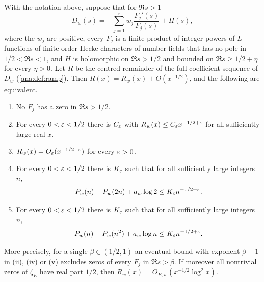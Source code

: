 \begin{theorem}\label{ana:thm:primeonly}
With the notation above, suppose that for $\Re s>1$
\[
 D_w(s)=-\sum_{j=1}^rw_j\frac{F_j'(s)}{F_j(s)}+H(s),
\]
where the $w_j$ are positive, every $F_j$ is a finite product of integer powers of
$L$-functions of finite-order Hecke characters of number fields that has no pole in
$1/2<\Re s<1$, and $H$ is holomorphic on $\Re s>1/2$ and bounded on $\Re s\ge1/2+\eta$ for
every $\eta>0$. Let $R$ be the centred remainder of the full coefficient sequence of $D_w$
(\cref{ana:def:ramp}). Then $R(x)=R_w(x)+O(x^{-1/2})$, and the following are equivalent.
\begin{enumerate}[label=\textup{(\roman*)}]
\item No $F_j$ has a zero in $\Re s>1/2$.
\item For every $0<\varepsilon<1/2$ there is $C_\varepsilon$ with $R_w(x)\le C_\varepsilon x^{-1/2+\varepsilon}$ for all
 sufficiently large real $x$.
\item $R_w(x)=O_\varepsilon(x^{-1/2+\varepsilon})$ for every $\varepsilon>0$.
\item For every $0<\varepsilon<1/2$ there is $K_\varepsilon$ such that for all sufficiently large integers
 $n$,
 \begin{equation}\label{ana:eq:dyadicint}
  P_w(n)-P_w(2n)+a_w\log 2\le K_\varepsilon n^{-1/2+\varepsilon}.
 \end{equation}
\item For every $0<\varepsilon<1/2$ there is $K_\varepsilon$ such that for all sufficiently large integers
 $n$,
 \begin{equation}\label{ana:eq:squareint}
  P_w(n)-P_w(n^2)+a_w\log n\le K_\varepsilon n^{-1/2+\varepsilon}.
 \end{equation}
\end{enumerate}
More precisely, for a single $\beta\in(1/2,1)$ an eventual bound with exponent $\beta-1$ in
\textup{(ii)}, \textup{(iv)} or \textup{(v)} excludes zeros of every $F_j$ in $\Re s>\beta$. If
moreover all nontrivial zeros of $\zeta_E$ have real part $1/2$, then
$R_w(x)=O_{E,w}(x^{-1/2}\log^2x)$.
\end{theorem}


